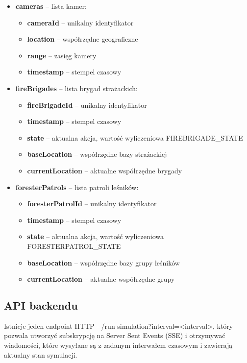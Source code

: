 \documentclass[11pt,a4paper]{article}
\begin{document}
\begin{itemize}
\begin{itemize}
        \item \textbf{location} – współrzędne geograficzne
        \item \textbf{timestamp} – stempel czasowy
    \end{itemize}
    \item \textbf{cameras} – lista kamer:
    \begin{itemize}
        \item \textbf{cameraId} – unikalny identyfikator
        \item \textbf{location} – współrzędne geograficzne
        \item \textbf{range} – zasięg kamery
        \item \textbf{timestamp} – stempel czasowy
    \end{itemize}
    \item \textbf{fireBrigades} – lista brygad strażackich:
    \begin{itemize}
        \item \textbf{fireBrigadeId} – unikalny identyfikator
        \item \textbf{timestamp} – stempel czasowy
        \item \textbf{state} – aktualna akcja, wartość wyliczeniowa FIREBRIGADE\_STATE
        \item \textbf{baseLocation} – współrzędne bazy strażackiej
        \item \textbf{currentLocation} – aktualne współrzędne brygady
    \end{itemize}
    \item \textbf{foresterPatrols} – lista patroli leśników:
    \begin{itemize}
        \item \textbf{foresterPatrolId} – unikalny identyfikator
        \item \textbf{timestamp} – stempel czasowy
        \item \textbf{state} – aktualna akcja, wartość wyliczeniowa FORESTERPATROL\_STATE
        \item \textbf{baseLocation} – współrzędne bazy grupy leśników
        \item \textbf{currentLocation} – aktualne współrzędne grupy
    \end{itemize}
\end{itemize}

\subsection{API backendu}
Istnieje jeden endpoint HTTP - /run-simulation?interval=<interval>, który pozwala utworzyć subskrypcję na Server Sent Events (SSE) i otrzymywać wiadomości, które wysyłane są z zadanym interwałem czasowym i zawierają aktualny stan symulacji. 
\end{document}
